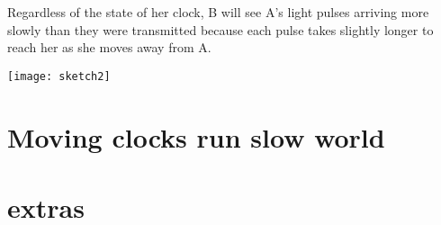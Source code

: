 \documentclass{report}
\begin{document}
Regardless of the state of her clock, B will see A's light pulses arriving more slowly than they were transmitted because each pulse takes slightly longer to reach her as she moves away from A.

\texttt{[image: sketch2]}








\section*{Moving clocks run slow world}
\section*{extras}

\end{document}
